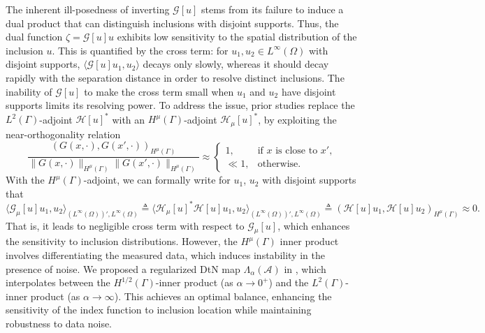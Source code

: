 \documentclass[onefignum,onetabnum]{siamart190516}
\numberwithin{equation}{section}
\begin{document}
The inherent ill-posedness of inverting $\mathcal{G}[u]$ stems from its failure to induce a dual product that can distinguish inclusions with disjoint supports.
Thus, the dual function $\zeta = \mathcal{G}[u]u$ exhibits low sensitivity to the spatial distribution of the inclusion $u$.
{
This is quantified by the cross term: for $u_1, u_2 \in L^{\infty}(\Omega)$ with disjoint supports, $\langle \mathcal{G}[u]u_1, u_2 \rangle$ decays only slowly, whereas it should decay rapidly with the separation distance in order to resolve distinct inclusions.}
The inability of $\mathcal{G}[u]$ to make the cross term small when $u_1$ and $u_2$ have disjoint supports limits its resolving power.
To address the issue, prior studies \cite{Zou2015,Zou2014} replace the $L^2(\Gamma)$-adjoint $\mathcal{H}[u]^*$ with an $H^{\mu}(\Gamma)$-adjoint $\mathcal{H}_{\mu}[u]^*$, by exploiting the near-orthogonality relation 
\begin{equation*}
\frac{(G(x,\cdot), G(x',\cdot))_{H^{\mu}(\Gamma)}}{\|G(x,\cdot)\|_{H^{\mu}(\Gamma)}\|G(x',\cdot)\|_{H^{\mu}(\Gamma)}} \approx
\begin{cases}
1, & \text{if $x$ is close to $x'$,} \\
\ll 1, & \text{otherwise}.
\end{cases}
\end{equation*}
{With the $H^{\mu}(\Gamma)$-adjoint, we can formally write for $u_{1}$, $u_{2}$ with disjoint supports that}
\begin{equation*}
\langle \mathcal{G}_{\mu}[u]u_1, u_2 \rangle_{(L^\infty(\Omega))', L^\infty(\Omega)} \triangleq\langle \mathcal{H}_{\mu}[u]^* \mathcal{H}[u]u_{1},u_{2}\rangle_{(L^{\infty}(\Omega))',L^{\infty}(\Omega)}\triangleq (\mathcal{H}[u]u_1, \mathcal{H}[u]u_2)_{H^{\mu}(\Gamma)} \approx 0.
\end{equation*}
That is, it leads to negligible cross term with respect to $\mathcal{G}_{\mu}[u]$, which enhances the sensitivity to inclusion distributions.
However, the $H^{\mu}(\Gamma)$ inner product involves differentiating the measured data, which induces instability in the presence of noise.
{We proposed a regularized DtN map $\Lambda_{\alpha}(\mathcal{A})$ in \cite{Ito2025Iterative}, }
which interpolates between the $H^{1/2}(\Gamma)$-inner product (as $\alpha \to 0^+$) and the $L^{2}(\Gamma)$-inner product (as $\alpha \to \infty$).
This achieves an optimal balance, enhancing the sensitivity of the index function to inclusion location while maintaining robustness to data noise.
\end{document}
